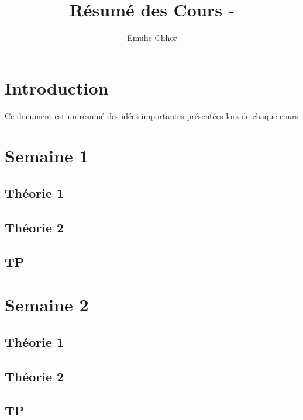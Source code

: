 \documentclass{article}
\begin{document}
\title{Résumé des Cours - }
\author{Emulie Chhor}
\maketitle

\section*{Introduction}

Ce document est un résumé des idées importantes présentées lors de chaque cours

\newtheorem{definition}{Definition}[subsection]
\newtheorem{theorem}{Theorem}[subsection]
\newtheorem{corollary}{Corollary}[subsection]
\newtheorem{lemma}[theorem]{Lemma}
\newtheorem{proposition}{Proposition}[section]
\newtheorem{axiom}{Axiome}
\newtheorem{property}{Propriété}[subsection]
\newtheorem*{remark}{Remarque}
\newtheorem*{problem}{Problème}
\newtheorem*{intuition}{Intuition}

\pagebreak
\section{Semaine 1}
\subsection{Théorie 1}
\subsection{Théorie 2}
\subsection{TP}

\pagebreak

\section{Semaine 2}
\subsection{Théorie 1}
\subsection{Théorie 2}
\subsection{TP}
\end{document}
